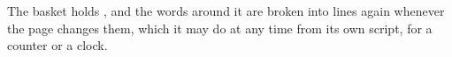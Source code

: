 The basket holds , and the words around
it are broken into lines again whenever the page changes them, which it may
do at any time from its own script, for a counter or a clock.
